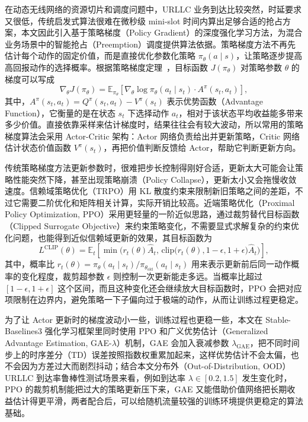 在动态无线网络的资源切片和调度问题中，URLLC 业务到达比较突然，时延要求又很低，传统启发式算法很难在微秒级 mini-slot 时间内算出足够合适的抢占方案，本文因此引入基于策略梯度（Policy Gradient）的深度强化学习方法，为混合业务场景中的智能抢占（Preemption）调度提供算法依据。策略梯度方法不再先估计每个动作的固定价值，而是直接优化参数化策略 $\pi_\theta(a \mid s)$，让策略逐步提高高回报动作的选择概率。根据策略梯度定理~\cite{sutton1999}，目标函数 $J(\pi_\theta)$ 对策略参数 $\theta$ 的梯度可以写成
\begin{equation}
\nabla_\theta J(\pi_\theta)
=
\mathbb{E}_{\pi_\theta}
\left[
\nabla_\theta \log \pi_\theta(a_t \mid s_t)\cdot A^\pi(s_t,a_t)
\right],
\label{eq:policy_gradient}
\end{equation}
其中，$A^\pi(s_t,a_t)=Q^\pi(s_t,a_t)-V^\pi(s_t)$ 表示优势函数（Advantage Function），它衡量的是在状态 $s_t$ 下选择动作 $a_t$，相对于该状态平均收益能多带来多少价值。直接依靠采样来估计梯度时，结果往往会有较大波动，所以常用的策略梯度算法会采用 Actor-Critic 架构：Actor 网络负责给出并更新策略，Critic 网络估计状态价值函数 $V^\pi(s_t)$，再把价值判断反馈给 Actor，帮助它判断更新方向。

传统策略梯度方法更新参数时，很难把步长控制得刚好合适，更新太大可能会让策略性能突然下降，甚至出现策略崩溃（Policy Collapse），更新太小又会拖慢收敛速度。信赖域策略优化（TRPO）用 KL 散度约束来限制新旧策略之间的差距，不过它需要二阶优化和矩阵相关计算，实际开销比较高。近端策略优化（Proximal Policy Optimization, PPO）采用更轻量的一阶近似思路，通过裁剪替代目标函数（Clipped Surrogate Objective）来约束策略变化，不需要显式求解复杂的约束优化问题，也能得到近似信赖域更新的效果，其目标函数为
\begin{equation}
L^{\mathrm{CLIP}}(\theta)
=
\mathbb{E}_t
\left[
\min\!\Big(
r_t(\theta)\hat{A}_t,\,
\mathrm{clip}\big(r_t(\theta),1-\epsilon,1+\epsilon\big)\hat{A}_t
\Big)
\right],
\label{eq:ppo_clip_objective}
\end{equation}
其中，概率比 \(r_t(\theta)=\pi_\theta(a_t \mid s_t)/\pi_{\theta_{\mathrm{old}}}(a_t \mid s_t)\) 用来表示更新前后同一动作概率的变化程度，裁剪超参数 $\epsilon$ 则控制一次更新能走多远。当概率比超过 $[1-\epsilon,1+\epsilon]$ 这个区间，而且这种变化还会继续放大目标函数时，PPO 会把对应项限制在边界内，避免策略一下子偏向过于极端的动作，从而让训练过程更稳定。

为了让 Actor 更新时的梯度波动小一些，训练过程也更稳一些，本文在 Stable-Baselines3 强化学习框架里同时使用 PPO 和广义优势估计（Generalized Advantage Estimation, GAE-$\lambda$）机制，GAE 会加入衰减参数 $\lambda_{\mathrm{GAE}}$，把不同时间步上的时序差分（TD）误差按照指数权重累加起来，这样优势估计不会太偏，也不会因为方差过大而剧烈抖动；结合本文分布外（Out-of-Distribution, OOD）URLLC 到达率鲁棒性测试场景来看，例如到达率 $\lambda \in [0.2,1.5]$ 发生变化时，PPO 的裁剪机制能把过大的策略更新压下来，GAE 又能借助价值网络把长期收益估计得更平滑，两者配合后，可以给随机流量较强的训练环境提供更稳定的算法基础。

